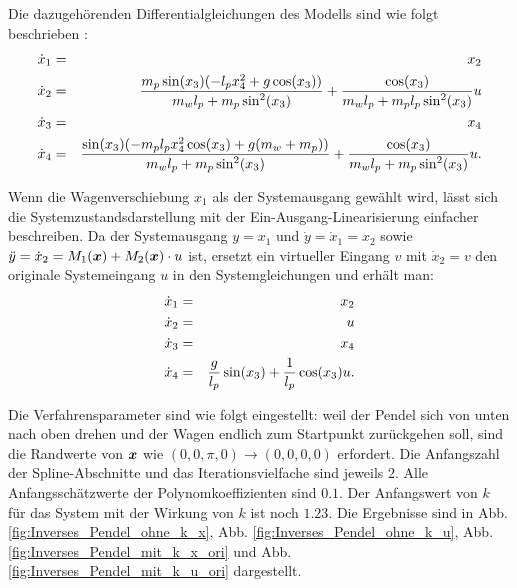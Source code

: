 \begin{beispiel}
	Die dazugehörenden Differentialgleichungen des Modells sind wie folgt beschrieben \cite{kunze2016pytrajectory}:
	\begin{eqnarray}
	\dot{x}_{1}&=&x_{2}\notag\\
	\dot{x}_{2}&=&\frac{m_{p}\sin(x_{3})(-l_{p}x_{4}^{2}+g\cos(x_{3}))}{m_{w}l_{p}+m_{p}\sin^{2}(x_{3})}+\frac{\cos(x_{3})}{m_{w}l_{p}+m_{p}l_{p}\sin^{2}(x_{3})}u\notag\\
	\dot{x}_{3}&=&x_{4}\notag\\
	\dot{x}_{4}&=&\frac{\sin(x_{3})(-m_{p}l_{p}x_{4}^{2}\cos(x_{3})+g(m_{w}+m_{p}))}{m_{w}l_{p}+m_{p}\sin^{2}(x_{3})}+\frac{\cos(x_{3})}{m_{w}l_{p}+m_{p}\sin^{2}(x_{3})}u.\label{eq:DLG_Inverses_Pendel_compact}   
	\end{eqnarray}
	
	Wenn die Wagenverschiebung $x_{1}$ als der Systemausgang gewählt wird, lässt sich die Systemzustandsdarstellung mit der Ein-Ausgang-Linearisierung einfacher beschreiben. Da der Systemausgang $y = x_{1}$ und $\dot{y} = \dot{x}_{1} = x_{2}$ sowie $\ddot{y} = \dot{x}_{2} = M_{1}(\boldsymbol x)+ M_{2}(\boldsymbol x)\cdot u$ ist, ersetzt ein virtueller Eingang $v$ mit $\dot{x}_{2} = v$ den originale Systemeingang $u$ in den Systemgleichungen und erhält man:  
	\begin{eqnarray}
	\dot{x}_{1}&=&x_{2}\notag\\
	\dot{x}_{2}&=&u\notag\\
	\dot{x}_{3}&=&x_{4}\notag\\
	\dot{x}_{4}&=&\frac{g}{l_{p}}\sin(x_{3})+\frac{1}{l_{p}}\cos(x_{3})u.\label{eq:DLG_Inverses_Pendel_partiell_lin}   
	\end{eqnarray}
	
	Die Verfahrensparameter sind wie folgt eingestellt: weil der Pendel sich von unten nach oben drehen und der Wagen endlich zum Startpunkt zurückgehen soll, sind die Randwerte von $\boldsymbol x$ wie $\left ( 0,0,\pi ,0 \right )\rightarrow \left ( 0,0,0,0 \right )$ erfordert. Die Anfangszahl der Spline-Abschnitte und das Iterationsvielfache sind jeweils $2$. Alle Anfangsschätzwerte der Polynomkoeffizienten sind $0.1$. Der Anfangswert von $k$ für das System mit der Wirkung von $k$ ist noch $1.23$. Die Ergebnisse sind in Abb. \ref{fig:Inverses_Pendel_ohne_k_x}, Abb. \ref{fig:Inverses_Pendel_ohne_k_u}, Abb. \ref{fig:Inverses_Pendel_mit_k_x_ori} und Abb. \ref{fig:Inverses_Pendel_mit_k_u_ori} dargestellt.
	

\end{beispiel}
